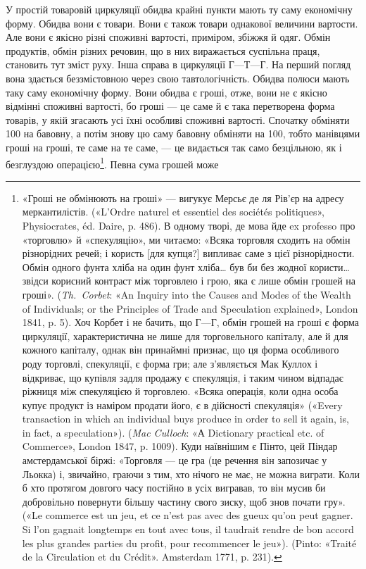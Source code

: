 У простій товаровій циркуляції обидва крайні пункти мають
ту саму економічну форму. Обидва вони є товари. Вони є також
товари однакової величини вартости. Але вони є якісно різні
споживні вартості, приміром, збіжжя й одяг. Обмін продуктів,
обмін різних речовин, що в них виражається суспільна праця,
становить тут зміст руху. Інша справа в циркуляції $Г — Т — Г$.
На перший погляд вона здається беззмістовною через свою тавтологічність.
Обидва полюси мають таку саму економічну форму.
Вони обидва є гроші, отже, вони не є якісно відмінні споживні
вартості, бо гроші — це саме й є така перетворена форма товарів,
у якій згасають усі їхні особливі споживні вартості. Спочатку
обміняти 100 на бавовну, а потім знову цю саму
бавовну обміняти на 100, тобто манівцями
гроші на гроші, те саме на те саме, — це видається так само безцільною,
як і безглуздою операцією\footnote{
«Гроші не обмінюють на гроші» — вигукує Мерсьє де ля Рів’єр
на адресу меркантилістів. («L’Ordre naturel et essentiel des sociétés politiques»,
Physiocrates, éd. Daire, p. 486). В одному творі, де мова йде
ex professo про «торговлю» й «спекуляцію», ми читаємо: «Всяка торговля
сходить на обмін різнорідних речей; і користь [для купця?] випливає
саме з цієї різнорідности. Обмін одного фунта хліба на один фунт хліба\dots{}
був би без жодної користи\dots{} звідси корисний контраст між торговлею
і грою, яка є лише обмін грошей на гроші». (\emph{Th.~Corbet}: «An Inquiry
into the Causes and Modes of the Wealth of Individuals; or the Principles
of Trade and Speculation explained», London 1841, p. 5). Хоч Корбет і не
бачить, що $Г — Г$, обмін грошей на гроші є форма циркуляції, характеристична
не лише для торговельного капіталу, але й для кожного капіталу,
однак він принаймні признає, що ця форма особливого роду торговлі,
спекуляції, є форма гри; але з’являється Мак Куллох і відкриває, що
\parbreak{}
купівля задля продажу є спекуляція, і таким чином відпадає ріжниця
між спекуляцією й торговлею. «Всяка операція, коли одна особа купує
продукт із наміром продати його, є в дійсності спекуляція» («Every
transaction in which an individual buys produce in order to sell it again,
is, in fact, a speculation»). (\emph{Mac Culloch}: «А Dictionary practical etc.
of Commerce», London 1847, p. 1009). Куди наївнішим є Пінто, цей Піндар
амстердамської біржі: «Торговля — це гра (це речення він запозичає
у Льокка) і, звичайно, граючи з тим, хто нічого не має, не можна
виграти. Коли б хто протягом довгого часу постійно в усіх вигравав,
то він мусив би добровільно повернути більшу частину свого зиску,
щоб знов почати гру». («Le commerce est un jeu, et ce n’est pas avec des
gueux qu’on peut gagner. Si l’on gagnait longtemps en tout avec tous, il
taudrait rendre de bon accord les plus grandes parties du profit, pour
recommencer le jeu»). (Pinto: «Traité de la Circulation et du Crédit».
Amsterdam 1771, p. 231).
}. Певна сума грошей може
